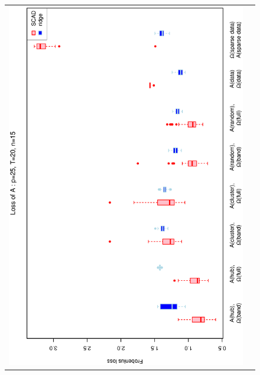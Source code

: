 \documentclass[a4paper]{article}
\begin{document}
\begin{figure}[h!]
\centering
\begin{tabular}{cc}
\includegraphics[scale=0.5,angle=270]{LossA25T20N15.eps}\\

\end{tabular}
\end{figure}
\end{document}
